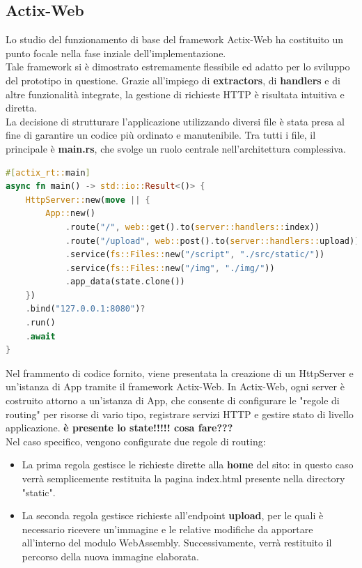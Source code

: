 \subsection{Actix-Web}
Lo studio del funzionamento di base del framework Actix-Web ha costituito un punto focale nella fase inziale dell'implementazione.
\\Tale framework si è dimostrato estremamente flessibile ed adatto per lo sviluppo del prototipo in questione.
Grazie all'impiego di \textbf{extractors}, di \textbf{handlers} e di altre funzionalità integrate, la gestione di richieste HTTP è risultata intuitiva e diretta.
\\La decisione di strutturare l'applicazione utilizzando diversi file è stata presa al fine di garantire un codice più ordinato e manutenibile.
Tra tutti i file, il principale è \textbf{main.rs}, che svolge un ruolo centrale nell'architettura complessiva.
\begin{lstlisting}[language=rust, label=lst:RustWasi, caption={Porzione del file main.rs}, showstringspaces=false]
#[actix_rt::main]
async fn main() -> std::io::Result<()> {
    HttpServer::new(move || {
        App::new()
            .route("/", web::get().to(server::handlers::index))
            .route("/upload", web::post().to(server::handlers::upload))
            .service(fs::Files::new("/script", "./src/static/"))
            .service(fs::Files::new("/img", "./img/"))
            .app_data(state.clone())
    })
    .bind("127.0.0.1:8080")?
    .run()
    .await
}
\end{lstlisting}
Nel frammento di codice fornito, viene presentata la creazione di un HttpServer e un'istanza di App tramite il framework Actix-Web.
In Actix-Web, ogni server è costruito attorno a un'istanza di App, che consente di configurare le "regole di routing" per risorse di vario tipo, registrare servizi HTTP e gestire stato di livello applicazione.
\textbf{è presente lo state!!!!! cosa fare???}
\\Nel caso specifico, vengono configurate due regole di routing:
\begin{itemize}
    \item La prima regola gestisce le richieste dirette alla \textbf{home} del sito: in questo caso verrà semplicemente restituita la pagina index.html presente nella directory "static".
    \item La seconda regola gestisce richieste all'endpoint \textbf{upload}, per le quali è necessario ricevere un'immagine e le relative modifiche da apportare all'interno del modulo WebAssembly. Successivamente, verrà restituito il percorso della nuova immagine elaborata.
\end{itemize}
